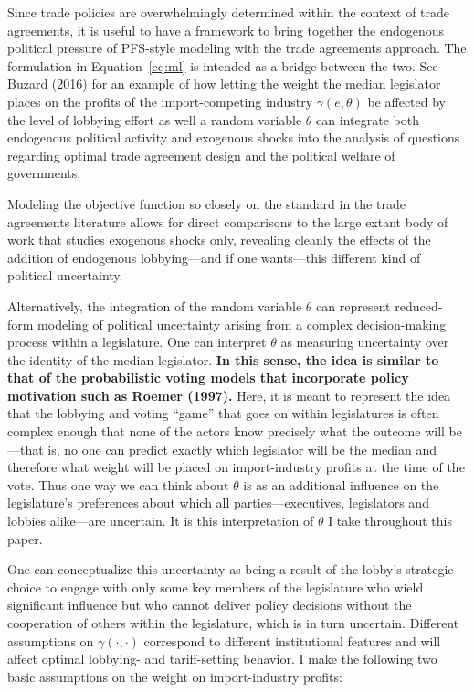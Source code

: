 \documentclass[10pt]{article}
\newcommand{\ve}{\theta}
\newcommand{\ta}{\theta}
\newcommand{\ga}{\gamma}
\begin{document}
Since trade policies are overwhelmingly determined within the context of trade agreements, it is useful to have a framework to bring together the endogenous political pressure of PFS-style modeling with the trade agreements approach. The formulation in Equation~\ref{eq:ml} is intended as a bridge between the two. See Buzard (2016) for an example of how letting the weight the median legislator places on the profits of the import-competing industry $\ga(e,\ve)$ be affected by the level of lobbying effort as well a random variable $\ta$ can integrate both endogenous political activity and exogenous shocks into the analysis of questions regarding optimal trade agreement design and the political welfare of governments.

Modeling the objective function so closely on the standard in the trade agreements literature allows for direct comparisons to the large extant body of work that studies exogenous shocks only, revealing cleanly the effects of the addition of endogenous lobbying---and if one wants---this different kind of political uncertainty.

Alternatively, the integration of the random variable $\ta$ can represent reduced-form modeling of political uncertainty arising from a complex decision-making process within a legislature. One can interpret $\ta$ as measuring uncertainty over the identity of the median legislator. \textbf{In this sense, the idea is similar to that of the probabilistic voting models that incorporate policy motivation such as Roemer (1997).} Here, it is meant to represent the idea that the lobbying and voting ``game'' that goes on within legislatures is often complex enough that none of the actors know precisely what the outcome will be---that is, no one can predict exactly which legislator will be the median and therefore what weight will be placed on import-industry profits at the time of the vote. Thus one way we can think about $\ta$ is as an additional influence on the legislature's preferences about which all parties---executives, legislators and lobbies alike---are uncertain. It is this interpretation of $\ta$ I take throughout this paper. %

One can conceptualize this uncertainty as being a result of the lobby's strategic choice to engage with only some key members of the legislature who wield significant influence but who cannot deliver policy decisions without the cooperation of others within the legislature, which is in turn uncertain. Different assumptions on $\ga(\cdot,\cdot)$ correspond to different institutional features and will affect optimal lobbying- and tariff-setting behavior. I make the following two basic assumptions on the weight on import-industry profits: %
\end{document}
